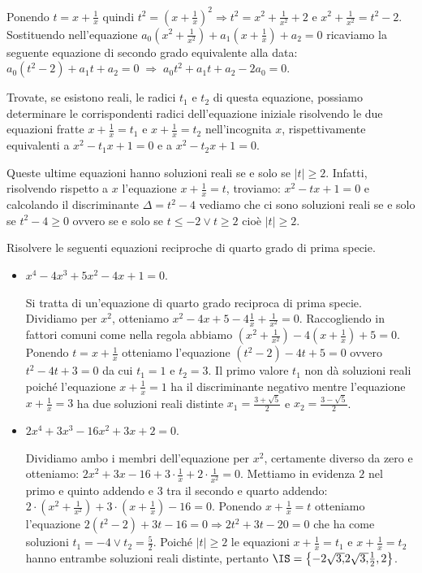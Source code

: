 Ponendo $t=x+\frac 1 x$ quindi $t^2=\left(x+\frac 1 x\right)^2\Rightarrow t^2=x^2+\frac 1{x^2}+2$ e $x^2+\frac 1{x^2}=t^2-2$. Sostituendo nell’equazione $a_0\left(x^2+\frac 1{x^2}\right)+a_1\left(x+\frac 1 x\right)+a_2=0$ ricaviamo la seguente equazione di secondo grado equivalente alla data: $a_0\left(t^2-2\right)+a_1t+a_2=0\;\Rightarrow \;a_0t^2+a_1t+a_2-2a_0=0$.

Trovate, se esistono reali, le radici $t_1$ e $t_2$ di questa equazione, possiamo determinare le corrispondenti radici dell’equazione iniziale risolvendo le due equazioni fratte $x+\frac 1 x=t_1$ e $x+\frac 1 x=t_2$ nell’incognita $x$, rispettivamente equivalenti a $x^2-t_1x+1=0$ e a ${x}^2-t_2x+1=0$.

Queste ultime equazioni hanno soluzioni reali se e solo se $|t |\ge 2$. Infatti, risolvendo rispetto a $x$ l’equazione $x+\frac 1 x=t$, troviamo: $x^2-tx+1=0$ e calcolando il discriminante $\Delta =t^2-4$ vediamo che ci sono soluzioni reali se e solo se $t^2-4\ge 0$ ovvero se e solo se $t\le -2 \vee t\ge 2$ cioè $|t|\ge 2$.
\newpage
\begin{exrig}
 \begin{esempio}
 Risolvere le seguenti equazioni reciproche di quarto grado di prima specie.
 \begin{itemize}
 \item $x^4-4x^3+5x^2-4x+1=0$.

 Si tratta di un’equazione di quarto grado reciproca di prima specie. Dividiamo per $x^2$, otteniamo $x^2-4x+5-4\frac 1 x+\frac 1{x^2}=0$. Raccogliendo in fattori comuni come nella regola abbiamo $\left(x^2+\frac 1{x^2}\right)-4\left(x+\frac 1 x\right)+5=0$. Ponendo $t=x+\frac 1 x$ otteniamo l’equazione $ \left(t^2-2\right)-4t+5=0$ ovvero $t^2-4t+3=0$ da cui $t_1=1$ e $t_2=3$. Il primo valore $t_1$ non dà soluzioni reali poiché l’equazione $x+\frac 1 x=1$ ha il discriminante negativo mentre l’equazione $x+\frac 1 x=3$ ha due soluzioni reali distinte $x_1=\frac{3+\sqrt 5} 2$ e $x_2=\frac{3-\sqrt 5} 2$.

 \item $ 2x^4+3x^3-16x^2+3x+2=0 $.

 Dividiamo ambo i membri dell’equazione per $x^2$, certamente diverso da zero e otteniamo: $2x^2+3x-16+3\cdot \frac 1 x+2\cdot \frac 1{x^2}=0$. Mettiamo in evidenza $ 2 $ nel primo e quinto addendo e $ 3 $ tra il secondo e quarto addendo: $2\cdot \left(x^2+\frac 1{x^2}\right)+3\cdot \left(x+\frac 1 x\right)-16=0$. Ponendo $x+\frac 1 x=t$ otteniamo l'equazione $2(t^2-2)+3t-16=0\Rightarrow 2t^2+3t-20=0$ che ha come soluzioni $t_1=-4\vee t_2=\frac 5 2$. Poiché $|t|\ge 2$ le equazioni $x+\frac 1 x=t_1$ e $x+\frac 1 x=t_2$ hanno entrambe soluzioni reali distinte, pertanto $\IS=\left\{-2\sqrt{3,}2\sqrt{3,}\frac 1 2,2\right\}$.
 \end{itemize}
 \end{esempio}
\end{exrig}
\ovalbox{\risolvii \ref{ese:5.45},\ref{ese:5.46}}

